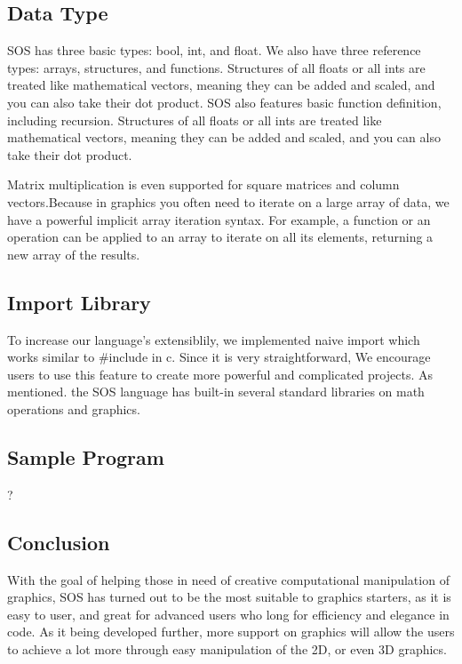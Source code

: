 \documentclass[main.tex]{subfiles}
\begin{document}
	\subsection{Data Type}
	SOS has three basic types: bool, int, and float. We also have three reference types: arrays, structures, and functions.
	Structures of all floats or all ints are treated like mathematical vectors, meaning they can be added and scaled, and you can also take their dot product. 
    SOS also features basic function definition, including recursion.
    Structures of all floats or all ints are treated like mathematical vectors, meaning they can be added and scaled, and you can also take their dot product. 
    
    Matrix multiplication is even supported for square matrices and column vectors.Because in graphics you often need to iterate on a large array of data, we have a powerful implicit array iteration syntax. For example, a function or an operation can be applied to an array to iterate on all its elements, returning a new array of the results.

    \subsection{Import Library}
     To increase our language’s extensiblily, we implemented naive import which works similar to \#include in c. Since it is very straightforward, We encourage users to use this feature to create more powerful and complicated projects. As mentioned. the SOS language has built-in several standard libraries on math operations and graphics. 
     
    \subsection{Sample Program}
    ?

    \subsection{Conclusion}
    With the goal of helping those in need of creative computational manipulation of graphics, SOS has turned out to be the most suitable to graphics starters, as it is easy to user, and great for advanced users who long for efficiency and elegance in code. As it being developed further, more support on graphics will allow the users to achieve a lot more through easy manipulation of the 2D, or even 3D graphics.

	
\end{document}
